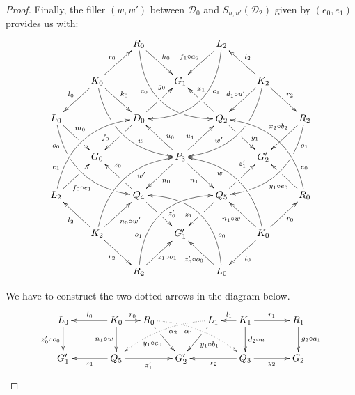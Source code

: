 \documentclass[a4paper,UKenglish,cleveref,pdftex,thm-restate,numberwithinsect]{lipics-v2021}
\def\G{\textbf {\textup{G}}}
\newcommand{\dder}[1]{\mathscr{#1}}
\begin{document}
\begin{proof}
		Finally, the filler $(w,w')$  between $\dder{D}_0$ and $S_{u,u'}(\dder{D}_2)$ given by $(e_0, e_1)$ provides us with:
		\[\xymatrix{&&R_0 \ar@/_1cm/[ddrr]_(.35){e_0}|(.7)\hole \ar[dr]^{h_0}&& L_2\ar@/^1cm/[ddll]^(.35){e_1}  \ar[dl]_{f_1\circ a_2}\\&K_0\ar[dr]^{k_0}\ar[dl]_{l_0} \ar@/_.8cm/[ddrr]|(.36)\hole^(.65){w}\ar[ur]^{r_0}&& G_1 && K_2 \ar@/^.8cm/[ddll]|(.36)\hole_(.65){w'}\ar[dl]_{d_1\circ u'\hspace{-5pt}}\ar[lu]_{l_2} \ar[dr]^{r_2}\\L_0 \ar@/_.8cm/[ddrr]_(.2){o_0}|(.31)\hole|(.81)\hole \ar[dr]^(.4){m_0}|(.61)\hole && D_0 \ar[dl]|(.4)\hole_(.65){f_0}\ar[ur]|(.5)\hole^(.7){g_0}&&Q_2 \ar[dr]|(.4)\hole^(.65){y_1} \ar[ul]|(.5)\hole_(.65){x_1}&&R_2\ar@/^.8cm/[ddll]^(.2){o_1}|(.31)\hole|(.81)\hole\ar[dl]_(.35){x_2\circ b_2}\\&G_0 &&P_3\ar[dr]_{n_1} \ar[dl]^{n_0}\ar[ur]^(.4){u_1}\ar[ul]_(.4){u_0}&&G'_2\\L_2 \ar@/^.8cm/[uurr]^(.2){e_1} \ar[ur]_(.35){f_0\circ e_1}|(.61)\hole&&Q_4 \ar[ul]|(.4)\hole_(.65){z_0}\ar[dr]|(.5)\hole^(.65){z'_0} &&Q_5\ar[ur]|(.4)\hole^(.65){z'_1} \ar[dl]|(.5)\hole_(.65){z_1} && R_0  \ar[ul]^(.35){y_1\circ e_0}|(.61)\hole\ar@/_.8cm/[uull]_(.2){e_0}\\&K_2 \ar[ur]_{n_0\circ w'} \ar[dr]_{r_2} \ar[ul]^{l_2}\ar@/^.8cm/[uurr]_(.65){w'}&&G'_1&& K_0 \ar[ur]_{r_0} \ar[ul]^{n_1\circ w} \ar[dl]^{l_0} \ar@/_.8cm/[uull]^(.65){w}\\&& R_2 \ar[ur]_{\hspace{-4pt}z_1\circ o_1}\ar@/^1cm/[uurr]^(.25){o_1}&& L_0 \ar[ul]^{z'_0\circ o_0\hspace{-5pt}} \ar@/_1cm/[uull]_(.25){o_0} |(.69)\hole }\]

		We have to construct the two dotted arrows in the diagram below.
		\[\xymatrix@C=15pt{L_0 \ar[d]_{z'_0\circ o_0}&& K_0 \ar[d]_{n_1\circ w}\ar[ll]_{l_0} \ar[r]^{r_0} & R_0 \ar@{.>}@/^.35cm/[drrr]_(.4){\alpha_1}|(.29)\hole \ar[dr]|(.28)\hole_{y_1\circ e_0} && L_1 \ar@{.>}@/_.35cm/[dlll]^(.4){\alpha_2} \ar[dl]|(.28)\hole^{y_1\circ b_1}& K_1 \ar[d]^{d_2\circ u}\ar[l]_{l_1} \ar[rr]^{r_1} && R_1 \ar[d]^{g_2\circ a_1}\\G'_1 && \ar[ll]^{z_1} Q_5 \ar[rr]_{z'_1}&& G'_2  && \ar[ll]^{x_2} Q_3 \ar[rr]_{y_2}&& G_2}\]


\end{proof}
\end{document}
